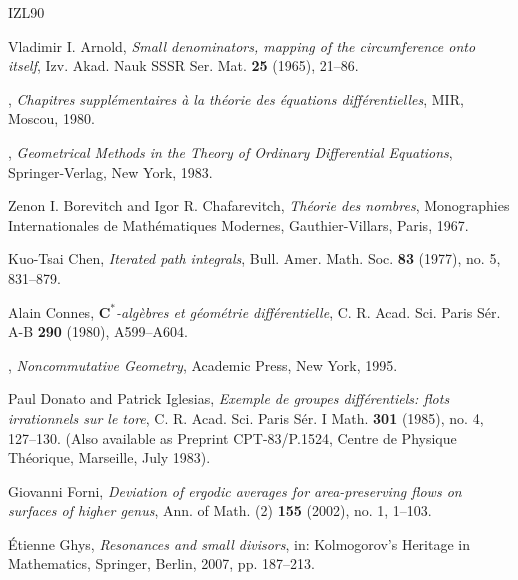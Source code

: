\documentclass[10pt,letterpaper,reqno]{amsart}
\theoremstyle{article}
\newcommand{\1}{{\hat 1}}
\newcommand{\0}{{\hat 0}}
\newcommand{\CC}{\mathbf C}
\begin{document}
  \begin{thebibliography}{IZL90} %
    
    Vladimir I. Arnold,
    \emph{Small denominators, mapping of the circumference onto itself},
    Izv. Akad. Nauk SSSR Ser. Mat. \textbf{25} (1965), 21--86.
    
    \bysame,
    \emph{Chapitres suppl{\'e}mentaires {\`a} la th{\'e}orie des {\'e}quations diff{\'e}rentielles},
    MIR, Moscou, 1980.
    
    \bysame,
    \emph{Geometrical Methods in the Theory of Ordinary Differential Equations},
    Springer-Verlag, New York, 1983.
    
    Zenon I. Borevitch and Igor R. Chafarevitch,
    \emph{Th{\'e}orie des nombres},
    Monographies Internationales de Math{\'e}matiques Modernes, Gauthier-Villars, Paris, 1967.
    
    Kuo-Tsai Chen,
    \emph{Iterated path integrals},
    Bull. Amer. Math. Soc. \textbf{83} (1977), no. 5, 831--879.
    
    Alain Connes,
    \emph{$\CC^*$-algèbres et géométrie différentielle},
    C. R. Acad. Sci. Paris Sér. A-B \textbf{290} (1980), A599--A604.
    
    \bysame,
    \emph{Noncommutative Geometry},
    Academic Press, New York, 1995.
        
    Paul Donato and Patrick Iglesias,
    \emph{Exemple de groupes différentiels: flots irrationnels sur le tore},
    C. R. Acad. Sci. Paris Sér. I Math. \textbf{301} (1985), no. 4, 127--130. (Also available as Preprint CPT-83/P.1524, Centre de Physique Théorique, Marseille, July 1983).
    
    Giovanni Forni,
    \emph{Deviation of ergodic averages for area-preserving flows on surfaces of higher genus},
    Ann. of Math. (2) \textbf{155} (2002), no. 1, 1--103.
    
    \'Etienne Ghys,
    \emph{Resonances and small divisors},
    in: Kolmogorov’s Heritage in Mathematics, Springer, Berlin, 2007, pp. 187--213.
    

\end{thebibliography}
\end{document}
